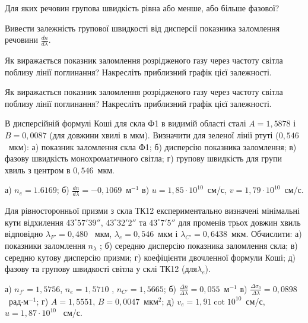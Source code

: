 \begin{problem}%
Для яких речовин групова швидкість рівна або менше, або більше
фазової?
\end{problem}


\begin{problem}%
Вивести залежність групової швидкості від дисперсії показника
заломлення речовини $\frac{dn}{d\lambda}$.
\end{problem}


\begin{problem}%
Як виражається показник заломлення розрідженого газу через частоту
світла поблизу лінії поглинання? Накресліть приблизний графік цієї
залежності.
\end{problem}


\begin{problem}%
Як виражається показник заломлення розрідженого газу через частоту
світла поблизу лінії поглинання? Накресліть приблизний графік цієї
залежності.
\end{problem}


\begin{problem}%
В дисперсійній формулі Коші для скла Ф1 в видимій області сталі
$A=1,5878$ і $B=0,0087$ (для довжини хвилі в мкм). Визначити для зеленої
лінії ртуті ($0,546$~мкм): а) показник заломлення скла Ф1; б) дисперсію
показника заломлення; в) фазову швидкість монохроматичного світла;
г) групову швидкість для групи хвиль з центром в $0,546$~мкм.
\begin{solution}
	а) $n_e=1.6169$; б) $\frac{d n}{d\lambda} =-0,1069$~м$^{-1}$ в) $u = 1,85\cdot10^{10}$~см/с, $v = 1,79\cdot10^{10}$~см/с.
\end{solution}
\end{problem}


\begin{problem}%
Для рівносторонньої призми з скла ТК12 експериментально визначені
мінімальні кути відхилення $43^\circ57'39''$, $43^\circ32'2''$ та $43^\circ7'5''$ для променів
трьох довжин хвиль відповідно $\lambda_{F'}= 0,480$~ мкм, $\lambda_e = 0,546$~мкм і
$\lambda_{C'}=0,6438$~мкм. Обчислити: а) показники заломлення $n_{\lambda}$ ; б) середню
дисперсію показника заломлення скла; в) середню кутову дисперсію
призми; г) коефіцієнти двочленної формули Коші; д) фазову та групову
швидкості світла у склі ТК12 (для$\lambda_e$).
\begin{solution}
	а) $n_{f'} = 1,5756$, $n_e = 1,5710$ , $n_{C'} =  1,5665$; б) $\frac{\Delta n}{\Delta\lambda} = 0,055$~м$^{-1}$ в) $\frac{\Delta \sigma_0}{\Delta\lambda} = 0,0898$~рад$\cdot$м$^{-1}$; г) $A = 1,5551$, $B = 0,0047$~мкм$^2$; д) $v_e = 1,91\cot10^{10}$~см/с, $u = 1,87\cdot10^{10}$~ см/с.
\end{solution}
\end{problem}


